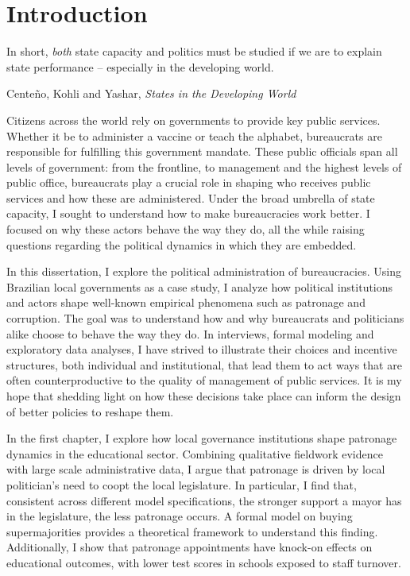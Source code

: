 
\section*{Introduction}

\epigraph{\singlespacing In short, \emph{both} state capacity and politics must be studied if we are to explain state performance -- especially in the developing world.}{\singlespacing Cente\~{n}o, Kohli and Yashar, \emph{States in the Developing World}}

\doublespacing

Citizens across the world rely on governments to provide key public services. Whether it be to administer a vaccine or teach the alphabet, bureaucrats are responsible for fulfilling this government mandate. These public officials span all levels of government: from the frontline, to management and the highest levels of public office, bureaucrats play a crucial role in shaping who receives public services and how these are administered. Under the broad umbrella of state capacity, I sought to understand how to make bureaucracies work better. I focused on why these actors behave the way they do, all the while raising questions regarding the political dynamics in which they are embedded.

In this dissertation, I explore the political administration of bureaucracies. Using Brazilian local governments as a case study, I analyze how political institutions and actors shape well-known empirical phenomena such as patronage and corruption. The goal was to understand how and why bureaucrats and politicians alike choose to behave the way they do. In interviews, formal modeling and exploratory data analyses, I have strived to illustrate their choices and incentive structures, both individual and institutional, that lead them to act ways that are often counterproductive to the quality of management of public services. It is my hope that shedding light on how these decisions take place can inform the design of better policies to reshape them.

In the first chapter, I explore how local governance institutions shape patronage dynamics in the educational sector. Combining qualitative fieldwork evidence with large scale administrative data, I argue that patronage is driven by local politician's need to coopt the local legislature. In particular, I find that, consistent across different model specifications, the stronger support a mayor has in the legislature, the less patronage occurs. A formal model on buying supermajorities provides a theoretical framework to understand this finding. Additionally, I show that patronage appointments have knock-on effects on educational outcomes, with lower test scores in schools exposed to staff turnover.

